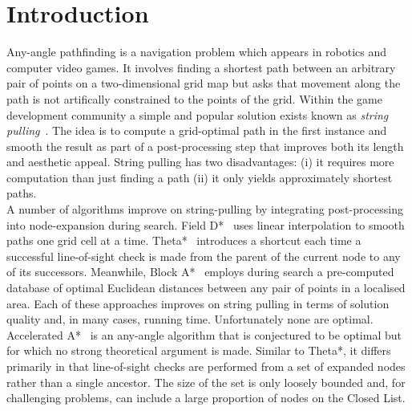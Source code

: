 \section{Introduction}
Any-angle pathfinding is a navigation problem which appears in robotics
and computer video games. It involves finding a shortest path between an 
arbitrary pair of points on a two-dimensional grid map but asks that 
movement along the path is not artifically constrained to the points of 
the grid.  Within the game development community a simple and popular 
solution exists known as \emph{string pulling}~\cite{pinter01,botea04}.
The idea is to compute a grid-optimal path in the first
instance and smooth the result as part of a post-processing step that improves
both its length and aesthetic appeal. String pulling has two disadvantages: 
(i) it requires more computation than just finding a path (ii)
it only yields approximately shortest paths.
\\
A number of algorithms improve on string-pulling by integrating post-processing
into node-expansion during search. Field D*~\cite{ferguson05} uses linear 
interpolation to smooth paths one grid cell at a time. 
Theta*~\cite{nash07} 
introduces a shortcut each time a successful line-of-sight check
is made from the parent of the current node to any of its successors.
Meanwhile, Block A*~\cite{yap11} employs during search a pre-computed database
of optimal Euclidean distances between any pair of points in a localised area.
Each of these approaches improves on string pulling in terms of solution 
quality and, in many cases, running time. Unfortunately none are optimal.
Accelerated A*~\cite{sislak09b} is an any-angle algorithm that is conjectured 
to be optimal but for which no strong theoretical argument is made. Similar to Theta*, 
it differs primarily in that line-of-sight checks are performed from a set
of expanded nodes rather than a single ancestor. The size of the set is only
loosely bounded and, for challenging problems, can include a large proportion
of nodes on the Closed List.
%
%
